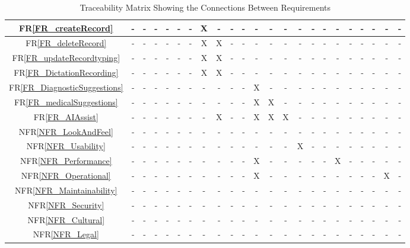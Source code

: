 \documentclass[12pt]{article}
\begin{document}
\begin{table}[H]
\begin{tabular}{|c|c|c|c|c|c|c|c|c|c|c|c|c|c|c|c|c|c|c|c|c|c|c|}
      FR\ref{FR_createRecord} & - & - & - & - & - & - & X & - & - & - & - & - & - & - & - & - & - & - & - & - & - & - \\ \hline
      FR\ref{FR_deleteRecord} & - & - & - & - & - & - & X & X & - & - & - & - & - & - & - & - & - & - & - & - & - & - \\ \hline
      FR\ref{FR_updateRecordtyping} & - & - & - & - & - & - & X & X &  - & - & - & - & - & - & - & - & - & - & - & - & - & - \\ \hline
      FR\ref{FR_DictationRecording} & - & - & - & - & - & - & X & X & - & - & - & - & - & - & - & - & - & - & - & - & - & - \\ \hline
      FR\ref{FR_DiagnosticSuggestions} & - & - & - & - & - & - & - & - & - & - & X & - & - & - & - & - & - & - & - & - & - & - \\ \hline
      FR\ref{FR_medicalSuggestions} & - & - & - & - & - & - & - & - & - & - & X & X & - & - & - & - & - & - & - & - & - & - \\ \hline
      FR\ref{FR_AIAssist} & - & - & - & - & - & - & - & X & - & - & X & X & X & - & - & - & - & - & - & - & - & - \\ \hline
      NFR\ref{NFR_LookAndFeel} & - & - & - & - & - & - & - & - & - & - & - & - & -  & - & - & - & - & - & - & - & - & - \\ \hline
      NFR\ref{NFR_Usability} & - & - & - & - & - & - & - & - & - & - & - & - & - & X & - & - & - & - & - & - & - & - \\ \hline
      NFR\ref{NFR_Performance} & - & - & - & - & - & - & - & - & - & - & X & - & - & - & - & - & X & - & - & - & - & - \\ \hline
      NFR\ref{NFR_Operational} & - & - & - & - & - & - & - & - & - & - & X & -  & - & - & - & - & - & - & - & - & X & - \\ \hline
      NFR\ref{NFR_Maintainability} & - & - & - & - & - & - & - & - & - & - & - & - & - & - & - & - & - & - & - & - & - & - \\ \hline
      NFR\ref{NFR_Security} & - & - & - & - & - & - & - & - & - & - & - & - & - & - & - & - & - & - & - & - & - & - \\ \hline
      NFR\ref{NFR_Cultural} & - & - & - & - & - & - & - & - & - & - & - & - & - & - & - & - & - & - & - & - & - & - \\ \hline
      NFR\ref{NFR_Legal} & - & - & - & - & - & - & - & - & - & - & - & - & - & - & - & - & - & - & - & - & - & - \\ \hline
      \end{tabular}
      \caption{Traceability Matrix Showing the Connections Between Requirements}
      \label{Table:A_trace}
      \end{table}
\end{document}
